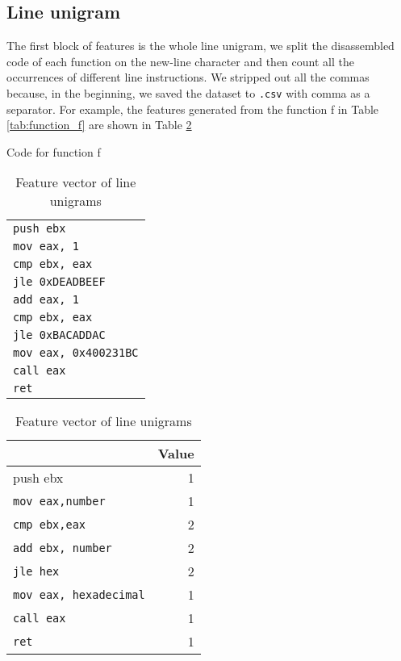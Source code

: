 \subsection{Line unigram}
The first block of features is the whole line unigram, we split the disassembled code of each function on the new-line character and then count all the occurrences of different line instructions. We stripped out all the commas because, in the beginning, we saved the dataset to \texttt{.csv} with comma as a separator. For example, the features generated from the function f in Table \ref{tab:function_f} are shown in Table \ref{tab:line_unigrams}

\begin{table}[!htb]
\begin{minipage}{.5\linewidth}
	\centering
	
	\caption{Code for function f}
	\label{tab:function_f}
	
	\medskip
	
	\begin{tabular}{ l } 
		\toprule
		\texttt{push ebx} \\
		\texttt{mov eax, 1}\\
		\texttt{cmp ebx, eax}\\
		\texttt{jle 0xDEADBEEF}\\
		\texttt{add eax, 1}\\
		\texttt{cmp ebx, eax}\\
		\texttt{jle 0xBACADDAC}\\
		\texttt{mov eax, 0x400231BC}\\
		\texttt{call eax}\\
		\texttt{ret}\\
	
		
		\bottomrule
	\end{tabular}
\end{minipage}\hfill
\begin{minipage}{.5\linewidth}
	\centering
	
	\caption{Feature vector of line unigrams}
	\label{tab:line_unigrams}
	
	\medskip
	
	\begin{tabular}{  lr } 
		\toprule
		\makecell{ Feature }  &  Value \\   
		
		\midrule push ebx       & 1         \\
		\texttt{mov eax,number} & 1                  \\ 
		\texttt{cmp ebx,eax }   & 2                  \\ 
		\texttt{add ebx, number}     & 2                  \\ 
		\texttt{jle hex }       & 2                  \\
		\texttt{mov eax, hexadecimal} & 1\\ 
		\texttt{call eax}       & 1                  \\
		\texttt{ret} & 1\\
		\bottomrule
	\end{tabular}
\end{minipage}
\end{table}


